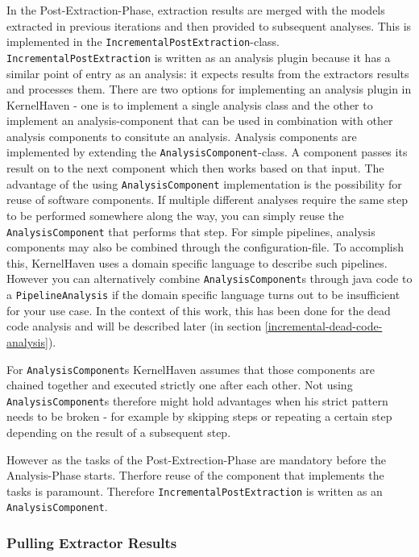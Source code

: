 \documentclass[a4paper]{article}
\begin{document}
In the Post-Extraction-Phase, extraction results are merged with the models extracted in previous iterations and then provided to subsequent analyses. This is implemented in the \texttt{IncrementalPostExtraction}-class. 
\texttt{IncrementalPostExtraction} is written as an analysis plugin because it has a similar point of entry as an analysis: it expects results from the extractors results and processes them. There are two options for implementing an analysis plugin in KernelHaven - one is to implement a single analysis class and the other to implement an analysis-component that can be used in combination with other analysis components to consitute an analysis. Analysis components are implemented by extending the \texttt{AnalysisComponent}-class. A component passes its result on to the next component which then works based on that input. The advantage of the using \texttt{AnalysisComponent} implementation is the possibility for reuse of software components. If multiple different analyses require the same step to be performed somewhere along the way, you can simply reuse the \texttt{AnalysisComponent} that performs that step. For simple pipelines, analysis components may also be combined through the configuration-file. To accomplish this, KernelHaven uses a domain specific language to describe such pipelines. However you can alternatively combine \texttt{AnalysisComponent}s through java code to a \texttt{PipelineAnalysis} if the domain specific language turns out to be insufficient for your use case. In the context of this work, this has been done for the dead code analysis and will be described later (in section \ref{incremental-dead-code-analysis}).

For \texttt{AnalysisComponent}s KernelHaven assumes that those components are chained together and executed strictly one after each other. Not using \texttt{AnalysisComponent}s therefore might hold advantages when his strict pattern needs to be broken - for example by skipping steps or repeating a certain step depending on the result of a subsequent step.

However as the tasks of the Post-Extrection-Phase are mandatory before the Analysis-Phase starts. Therfore reuse of the component that implements the tasks is paramount. Therefore \texttt{IncrementalPostExtraction} is written as an \texttt{AnalysisComponent}.

\subsubsection{Pulling Extractor Results}
\end{document}
